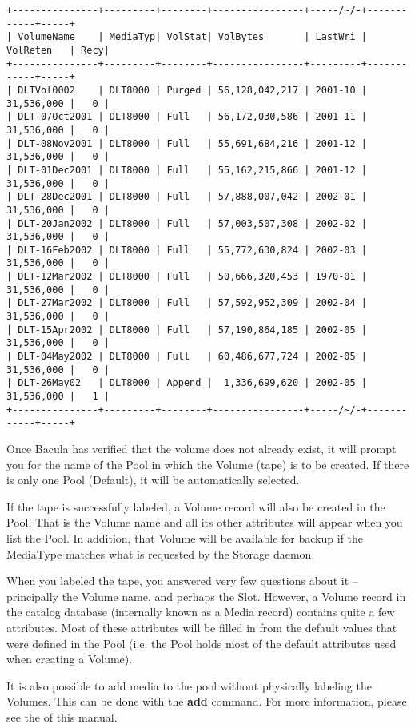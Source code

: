 \footnotesize
\begin{verbatim}
+---------------+---------+--------+----------------+-----/~/-+------------+-----+
| VolumeName    | MediaTyp| VolStat| VolBytes       | LastWri | VolReten   | Recy|
+---------------+---------+--------+----------------+---------+------------+-----+
| DLTVol0002    | DLT8000 | Purged | 56,128,042,217 | 2001-10 | 31,536,000 |   0 |
| DLT-07Oct2001 | DLT8000 | Full   | 56,172,030,586 | 2001-11 | 31,536,000 |   0 |
| DLT-08Nov2001 | DLT8000 | Full   | 55,691,684,216 | 2001-12 | 31,536,000 |   0 |
| DLT-01Dec2001 | DLT8000 | Full   | 55,162,215,866 | 2001-12 | 31,536,000 |   0 |
| DLT-28Dec2001 | DLT8000 | Full   | 57,888,007,042 | 2002-01 | 31,536,000 |   0 |
| DLT-20Jan2002 | DLT8000 | Full   | 57,003,507,308 | 2002-02 | 31,536,000 |   0 |
| DLT-16Feb2002 | DLT8000 | Full   | 55,772,630,824 | 2002-03 | 31,536,000 |   0 |
| DLT-12Mar2002 | DLT8000 | Full   | 50,666,320,453 | 1970-01 | 31,536,000 |   0 |
| DLT-27Mar2002 | DLT8000 | Full   | 57,592,952,309 | 2002-04 | 31,536,000 |   0 |
| DLT-15Apr2002 | DLT8000 | Full   | 57,190,864,185 | 2002-05 | 31,536,000 |   0 |
| DLT-04May2002 | DLT8000 | Full   | 60,486,677,724 | 2002-05 | 31,536,000 |   0 |
| DLT-26May02   | DLT8000 | Append |  1,336,699,620 | 2002-05 | 31,536,000 |   1 |
+---------------+---------+--------+----------------+-----/~/-+------------+-----+
\end{verbatim}
\normalsize

Once Bacula has verified that the volume does not already exist, it will
prompt you for the name of the Pool in which the Volume (tape) is to be
created.  If there is only one Pool (Default), it will be automatically
selected.

If the tape is successfully labeled, a Volume record will also be created in
the Pool. That is the Volume name and all its other attributes will appear
when you list the Pool. In addition, that Volume will be available for backup
if the MediaType matches what is requested by the Storage daemon. 

When you labeled the tape, you answered very few questions about it --
principally the Volume name, and perhaps the Slot. However, a Volume record in
the catalog database (internally known as a Media record) contains quite a few
attributes. Most of these attributes will be filled in from the default values
that were defined in the Pool (i.e. the Pool holds most of the default
attributes used when creating a Volume). 

It is also possible to add media to the pool without physically labeling the
Volumes. This can be done with the {\bf add} command. For more information,
please see the 
 of this manual. 
